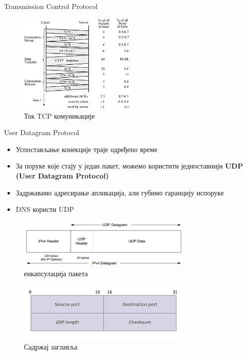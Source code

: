 \documentclass{beamer}
\begin{document}
\begin{frame}[allowframebreaks]{Transmission Control Protocol}
        \framebreak
        
        \begin{figure}
            \centering
            \includegraphics[width=0.5\textwidth]{images/tcp_http.png}
            \caption{Ток TCP комуникације}
            \label{fig:tcp_flow}
        \end{figure}
    \end{frame}
    
    \begin{frame}[allowframebreaks]{User Datagram Protocol}
        \begin{itemize}
            \item Успостављање конекције траје одређено време
            \item За поруке које стају у један пакет, можемо користити једноставнији \textbf{UDP (User Datagram Protocol)}
            \item Задржавамо адресирање апликација, али губимо гаранцију испоруке
            \item DNS користи UDP
        \end{itemize}
    
        \framebreak
        
        \begin{figure}
            \centering
            \includegraphics[width=0.75\textwidth]{images/udp_enc.png}
            \caption{енкапсулација пакета}
            \label{fig:udp_enc}
        \end{figure}
        
        \framebreak
        
        \begin{figure}
            \centering
            \includegraphics[width=0.75\textwidth]{images/udp_header.png}
            \caption{Садржај заглавља}
            \label{fig:udp_header}
        \end{figure}
    \end{frame}
\end{document}
